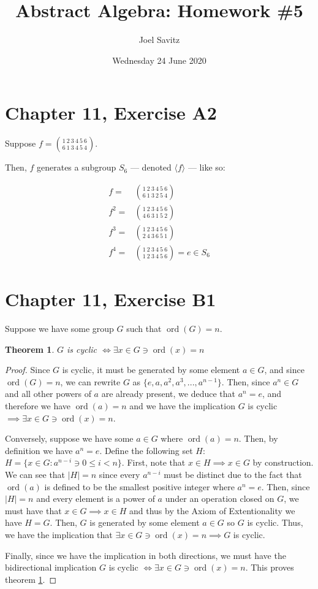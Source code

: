 \documentclass[12pt]{article}
\title{Abstract Algebra: Homework \#5}
\author{Joel Savitz}
\date{Wednesday 24 June 2020}
\newcommand{\ord}{\operatorname{ord}}
\newtheorem{thm}{Theorem}
\begin{document}
\maketitle

\section{Chapter 11, Exercise A2}

Suppose $f = \binom{1\ 2\ 3\ 4\ 5\ 6}{6\ 1\ 3\ 4\ 5\ 4}$.

Then, $f$ generates a subgroup $S_6$
--- denoted $\langle f \rangle$ ---
like so:

\begin{align}
	f = & \binom{1\ 2\ 3\ 4\ 5\ 6}{6\ 1\ 3\ 2\ 5\ 4} \\
	f^2 = & \binom{1\ 2\ 3\ 4\ 5\ 6}{4\ 6\ 3\ 1\ 5\ 2} \\
	f^3 = & \binom{1\ 2\ 3\ 4\ 5\ 6}{2\ 4\ 3\ 6\ 5\ 1} \\
	f^4 = & \binom{1\ 2\ 3\ 4\ 5\ 6}{1\ 2\ 3\ 4\ 5\ 6} = e \in S_6
\end{align}

\section{Chapter 11, Exercise B1}

Suppose we have some group $G$ such that
$\ord(G) = n$.

\begin{thm} \label{thm1}
	$G$ is cyclic $\iff \exists x \in G \ni \ord(x) = n$	
\end{thm}

\begin{proof}
	Since $G$ is cyclic,
	it must be generated
	by some element $a \in G$,
	and since $\ord(G) = n$,
	we can rewrite $G$ as
	$\{e, a, a^2, a^3, ..., a^{n-1} \}$.
	Then, since $a^n \in G$ and all other
	powers of $a$ are already present,
	we deduce that $a^n = e$,
	and therefore we have $\ord(a) = n$
	and we have the implication
	$G$ is cyclic $\implies \exists x \in G \ni \ord(x) = n$.

	Conversely,
	suppose we have some $a \in G$
	where $\ord(a) = n$.
	Then, by definition
	we have $a^n = e$.
	Define the following set $H$:
	$H = \{x \in G: a^{n-i} \ni 0 \le i < n \}$.
	First, note that $x \in H \implies x \in G$ by construction.
	We can see that $|H| = n$
	since every $a^{n-i}$ must be distinct
	due to the fact that $\ord(a)$ is defined
	to be the smallest positive integer
	where $a^n = e$.
	Then, since $|H| = n$ and every element is a power
	of $a$ under an operation closed on $G$,
	we must have that $x \in G \implies x \in H$
	and thus by the Axiom of Extentionality
	we have $H = G$.
	Then, $G$ is generated by some element $a \in G$
	so $G$ is cyclic.
	Thus, we have
	the implication that
	$\exists x \in G \ni \ord(x) = n \implies G$ is cyclic.

	Finally, since we have the implication in both directions,
	we must have the bidirectional implication
	$G$ is cyclic $\iff \exists x \in G \ni \ord(x) = n$.
	This proves theorem \ref{thm1}.
\end{proof}
\end{document}
